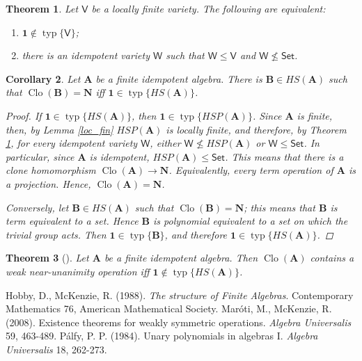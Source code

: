 \documentclass{amsart}
\theoremstyle{plain}
\newtheorem{theorem}{Theorem}[section]
\newtheorem{corollary}[theorem]{Corollary}
\theoremstyle{definition}
\theoremstyle{remark}
\DeclareMathOperator{\Clo}{Clo}
\DeclareMathOperator{\typ}{typ}
\begin{document}
\begin{theorem}
    \label{omitting_typ1}
    Let $\mathsf{V}$ be a locally finite variety. 
    The following are equivalent: 
    \begin{enumerate}
        \item $\mathbf{1} \notin \typ\{\mathsf{V}\}$; 
        \item there is an idempotent variety $\mathsf{W}$ such that $\mathsf{W} \le \mathsf{V}$ and $\mathsf{W} \nleq \mathsf{Set}$. 
    \end{enumerate}
\end{theorem}

\begin{corollary}
    Let $\mathbf{A}$ be a finite idempotent algebra. 
    There is $\mathbf{B} \in HS(\mathbf{A})$ such that $\Clo(\mathbf{B})=\mathbf{N}$ iff $\mathbf{1} \in \typ\{HS(\mathbf{A})\}$. 
    \begin{proof}
        If $\mathbf{1} \in \typ\{HS(\mathbf{A})\}$, then $\mathbf{1} \in \typ\{HSP(\mathbf{A})\}$. 
        Since $\mathbf{A}$ is finite, then, by Lemma \ref{loc_fin} $HSP(\mathbf{A})$ is locally finite, 
        and therefore, by Theorem \ref{omitting_typ1}, for every idempotent variety $\mathsf{W}$, either $\mathsf{W} \nleq HSP(\mathbf{A})$ or $\mathsf{W} \le \mathsf{Set}$. 
        In particular, since $\mathbf{A}$ is idempotent, $HSP(\mathbf{A}) \le \mathsf{Set}$. 
        This means that there is a clone homomorphism $\Clo(\mathbf{A}) \to \mathbf{N}$. 
        Equivalently, every term operation of $\mathbf{A}$ is a projection. 
        Hence, $\Clo(\mathbf{A}) = \mathbf{N}$. 

        Conversely, let $\mathbf{B} \in HS(\mathbf{A})$ such that $\Clo(\mathbf{B})=\mathbf{N}$; 
        this means that $\mathbf{B}$ is term equivalent to a set. 
        Hence $\mathbf{B}$ is polynomial equivalent to a set on which the trivial group acts. 
        Then $\mathbf{1} \in \typ\{\mathbf{B}\}$, and therefore $\mathbf{1} \in \typ\{HS(\mathbf{A})\}$. 
    \end{proof}
\end{corollary}

\begin{theorem}
    [\cite{wnu}]
    Let $\mathbf{A}$ be a finite idempotent algebra. 
    Then $\Clo(\mathbf{A})$ contains a weak near-unanimity operation iff $\mathbf{1} \notin \typ\{HS(\mathbf{A})\}$. 
\end{theorem}

\begin{thebibliography}{9}
    Hobby, D., McKenzie, R. (1988). \emph{The structure of Finite Algebras}. Contemporary Mathematics 76, American Mathematical Society.  
    Mar\'oti, M., McKenzie, R. (2008). Existence theorems for weakly symmetric operations. \emph{Algebra Universalis} 59, 463-489.
    P\'alfy, P. P. (1984). Unary polynomials in algebras I. \emph{Algebra Universalis} 18, 262-273.
 \end{thebibliography}
\end{document}
